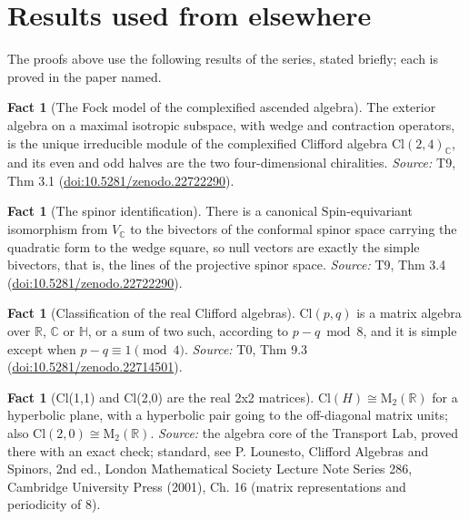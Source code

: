 \documentclass[11pt]{article}
\theoremstyle{definition}
\newtheorem{fact}[theorem]{Fact}
\theoremstyle{plain}
\providecommand{\C}{}\renewcommand{\C}{\mathbb{C}}
\providecommand{\Cl}{}\renewcommand{\Cl}{\mathrm{Cl}}
\providecommand{\HH}{}\renewcommand{\HH}{\mathbb{H}}
\providecommand{\Mat}{}\renewcommand{\Mat}{\mathrm{M}}
\providecommand{\R}{}\renewcommand{\R}{\mathbb{R}}
\providecommand{\Spin}{}\renewcommand{\Spin}{\mathrm{Spin}}
\begin{document}
\section{Results used from elsewhere}
The proofs above use the following results of the series, stated briefly; each is proved in the paper named.

\begin{fact}[The Fock model of the complexified ascended algebra]\label{c:correspondence.fock-model-complexified-ascended-algebra}
The exterior algebra on a maximal isotropic subspace, with wedge and contraction operators, is the unique irreducible module of the complexified Clifford algebra $\Cl(2,4)_\C$, and its even and odd halves are the two four-dimensional chiralities.
\emph{Source:} T9, Thm 3.1 (\href{https://doi.org/10.5281/zenodo.22722290}{doi:10.5281/zenodo.22722290}).
\end{fact}

\begin{fact}[The spinor identification]\label{c:correspondence.spinor-identification}
There is a canonical $\Spin$-equivariant isomorphism from $V_\C$ to the bivectors of the conformal spinor space carrying the quadratic form to the wedge square, so null vectors are exactly the simple bivectors, that is, the lines of the projective spinor space.
\emph{Source:} T9, Thm 3.4 (\href{https://doi.org/10.5281/zenodo.22722290}{doi:10.5281/zenodo.22722290}).
\end{fact}

\begin{fact}[Classification of the real Clifford algebras]\label{c:primer.classification-real-clifford-algebras}
$\Cl(p,q)$ is a matrix algebra over $\R$, $\C$ or $\HH$, or a sum of two such, according to $p - q \bmod 8$, and it is simple except when $p - q \equiv 1 \pmod 4$.
\emph{Source:} T0, Thm 9.3 (\href{https://doi.org/10.5281/zenodo.22714501}{doi:10.5281/zenodo.22714501}).
\end{fact}

\begin{fact}[Cl(1,1) and Cl(2,0) are the real 2x2 matrices]\label{c:std-algebra.cl11-matrix}
$\Cl(H) \cong \Mat_2(\R)$ for a hyperbolic plane, with a hyperbolic pair going to the off-diagonal matrix units; also $\Cl(2,0) \cong \Mat_2(\R)$.
\emph{Source:} the algebra core of the Transport Lab, proved there with an exact check; standard, see P. Lounesto, Clifford Algebras and Spinors, 2nd ed., London Mathematical Society Lecture Note Series 286, Cambridge University Press (2001), Ch. 16 (matrix representations and periodicity of 8).
\end{fact}
\end{document}
